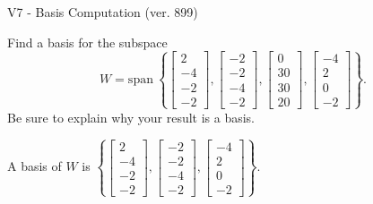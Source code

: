 \begin{exercise}
  \begin{exerciseTitle}V7 - Basis Computation (ver. 899)\end{exerciseTitle}
  \begin{exerciseStatement}
    Find a basis for the subspace 
\[W=\mathrm{span}\ \left\{\left[\begin{array}{r}
2 \\
-4 \\
-2 \\
-2
\end{array}\right] , \left[\begin{array}{r}
-2 \\
-2 \\
-4 \\
-2
\end{array}\right] , \left[\begin{array}{r}
0 \\
30 \\
30 \\
20
\end{array}\right] , \left[\begin{array}{r}
-4 \\
2 \\
0 \\
-2
\end{array}\right]\right\}.\]
 Be sure to explain why your result is a basis.


  \end{exerciseStatement}
  \begin{exerciseAnswer}
   A basis of \(W\) is  \(\left\{\left[\begin{array}{r}
2 \\
-4 \\
-2 \\
-2
\end{array}\right] , \left[\begin{array}{r}
-2 \\
-2 \\
-4 \\
-2
\end{array}\right] , \left[\begin{array}{r}
-4 \\
2 \\
0 \\
-2
\end{array}\right]\right\}\).
  


  \end{exerciseAnswer}
\end{exercise}